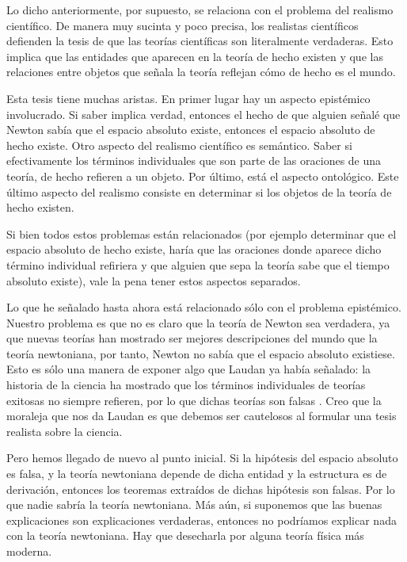 \documentclass[12pt]{article}
\begin{document}
Lo dicho anteriormente, por supuesto, se relaciona con el problema del realismo científico. De manera muy sucinta y poco precisa, los realistas científicos defienden la tesis de que las teorías científicas son literalmente verdaderas. Esto implica que las entidades que aparecen en la teoría de hecho existen y que las relaciones entre objetos que señala la teoría reflejan cómo de hecho es el mundo.

Esta tesis tiene muchas aristas. En primer lugar hay un aspecto epistémico involucrado. Si saber implica verdad, entonces el hecho de que alguien señalé que Newton sabía que el espacio absoluto existe, entonces el espacio absoluto de hecho existe. Otro aspecto del realismo científico es semántico. Saber si efectivamente los términos individuales que son parte de las oraciones de una teoría, de hecho refieren a un objeto. Por último, está el aspecto ontológico. Este último aspecto del realismo consiste en determinar si los objetos de la teoría de hecho existen.

Si bien todos estos problemas están relacionados (por ejemplo determinar que el espacio absoluto de hecho existe, haría que las oraciones donde aparece dicho término individual refiriera y que alguien que sepa la teoría sabe que el tiempo absoluto existe), vale la pena tener estos aspectos separados. 

Lo que he señalado hasta ahora está relacionado sólo con el problema epistémico. Nuestro problema es que no es claro que la teoría de Newton sea verdadera, ya que nuevas teorías han mostrado ser mejores descripciones del mundo que la teoría newtoniana, por tanto, Newton no sabía que el espacio absoluto existiese. Esto es sólo una manera de exponer algo que Laudan ya había señalado: la historia de la ciencia ha mostrado que los términos individuales de teorías exitosas no siempre refieren, por lo que dichas teorías son falsas \cite{Laudan1981}. Creo que la moraleja que nos da Laudan es que debemos ser cautelosos al formular una tesis realista sobre la ciencia. 

Pero hemos llegado de nuevo al punto inicial. Si la hipótesis del espacio absoluto es falsa, y la teoría newtoniana depende de dicha entidad y la estructura es de derivación, entonces los teoremas extraídos de dichas hipótesis son falsas. Por lo que nadie sabría la teoría newtoniana. Más aún, si suponemos que las buenas explicaciones son explicaciones verdaderas, entonces no podríamos explicar nada con la teoría newtoniana. Hay que desecharla por alguna teoría física más moderna.
\end{document}
